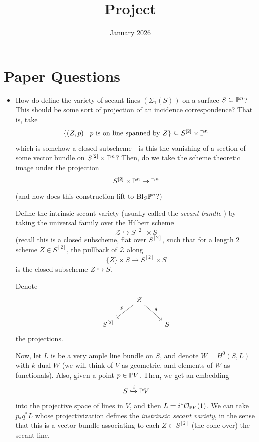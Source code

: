\documentclass[12pt]{article}
\title{Project}
\author{}
\date{January 2026}
\newcommand{\Bl}{\mathrm{Bl}}
\begin{document}

\section*{Paper Questions}

\begin{itemize}
    \item {\color{blue} How do define the variety of secant lines $(\Sigma_1(S))$ on a surface $S\subseteq \P^n$? This should be some sort of projection of an incidence correspondence? That is, take
    \[\{(Z,p) \mid \text{$p$ is on line spanned by $Z$}\} \subseteq S^{[2]}\times \P^n\]
    which is somehow a closed subscheme---is this the vanishing of a section of some vector bundle on $S^{[2]}\times \P^n$? Then, do we take the scheme theoretic image under the projection
    \[S^{[2]}\times \P^n \to \P^n\]
    (and how does this construction lift to $\Bl_S \P^n$?)}

    Define the intrinsic secant variety (usually called the \textit{secant bundle} \cite{schwarzenberger_secant_1964,bertram_moduli_1992}) by taking the universal family over the Hilbert scheme
    \[\mathcal{Z} \hookrightarrow S^{[2]}\times S\]
    (recall this is a closed subscheme, flat over $S^{[2]}$, such that for a length 2 scheme $Z\in S^{[2]}$, the pullback of $\mathcal{Z}$ along
    \[\{Z\}\times S \to S^{[2]}\times S\]
    is the closed subscheme $Z\hookrightarrow S$.

    Denote
    \[\begin{tikzcd}
    & \mathcal{Z} \ar[dl,"p"'] \ar[dr,"q"] &\\
    S^{[2]} && S
    \end{tikzcd}\]
    the projections.

    Now, let $L$ is be a very ample line bundle on $S$, and denote $W=H^0(S,L)$ with $k$-dual $W$ (we will think of $V$ as geometric, and elements of $W$ as functionals). Also, given a point $p\in \P V$. Then, we get an embedding
    \[S \xhookrightarrow{i} \P V\]
    into the projective space of lines in $V$, and then $L=i^*\cO_{\P V}(1)$. We can take $p_* q^*L$ whose projectivization defines the \textit{instrinsic secant variety}, in the sense that this is a vector bundle associating to each $Z\in S^{[2]}$ (the cone over) the secant line.
    

\end{itemize}
\end{document}
